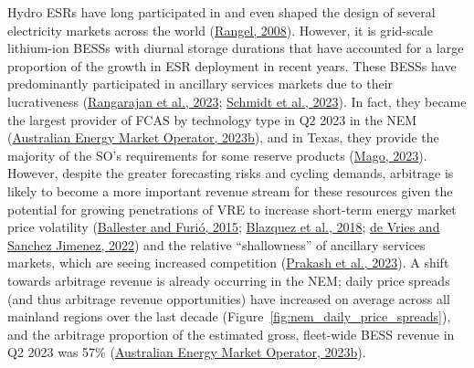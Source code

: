 \documentclass[12pt,a4paper,]{report}
\begin{document}
Hydro ESRs have long participated in and even shaped the design of
several electricity markets across the world
(\protect\hyperlink{ref-rangelCompetitionPolicyRegulation2008}{Rangel,
2008}). However, it is grid-scale lithium-ion BESSs with diurnal storage
durations that have accounted for a large proportion of the growth in
ESR deployment in recent years. These BESSs have predominantly
participated in ancillary services markets due to their lucrativeness
(\protect\hyperlink{ref-rangarajanAssessingImpactBattery2023}{Rangarajan
et al., 2023};
\protect\hyperlink{ref-schmidtMonetizingEnergyStorage2023a}{Schmidt et
al., 2023}). In fact, they became the largest provider of FCAS by
technology type in Q2 2023 in the NEM
(\protect\hyperlink{ref-australianenergymarketoperatorQuarterlyEnergyDynamics2023a}{Australian
Energy Market Operator, 2023b}), and in Texas, they provide the majority
of the SO's requirements for some reserve products
(\protect\hyperlink{ref-magoERCOTOperationalExperience2023}{Mago,
2023}). However, despite the greater forecasting risks and cycling
demands, arbitrage is likely to become a more important revenue stream
for these resources given the potential for growing penetrations of VRE
to increase short-term energy market price volatility
(\protect\hyperlink{ref-ballesterEffectsRenewablesStylized2015}{Ballester
and Furió, 2015};
\protect\hyperlink{ref-blazquezRenewableEnergyPolicy2018}{Blazquez et
al., 2018}; \protect\hyperlink{ref-devriesMarketSignalsAdequacy2022}{de
Vries and Sanchez Jimenez, 2022}) and the relative ``shallowness'' of
ancillary services markets, which are seeing increased competition
(\protect\hyperlink{ref-prakashQuantifyingReserveCapabilities2023}{Prakash
et al., 2023}). A shift towards arbitrage revenue is already occurring
in the NEM; daily price spreads (and thus arbitrage revenue
opportunities) have increased on average across all mainland regions
over the last decade (Figure~\ref{fig:nem_daily_price_spreads}), and the
arbitrage proportion of the estimated gross, fleet-wide BESS revenue in
Q2 2023 was 57\%
(\protect\hyperlink{ref-australianenergymarketoperatorQuarterlyEnergyDynamics2023a}{Australian
Energy Market Operator, 2023b}).
\end{document}

